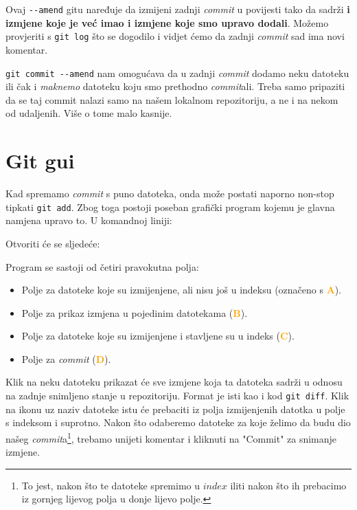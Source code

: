 
Ovaj \verb+--amend+ gitu naređuje da izmijeni zadnji \emph{commit} u povijesti tako da sadrži \textbf{i izmjene koje je već imao i izmjene koje smo upravo dodali}.
Možemo provjeriti s \verb+git log+ što se dogodilo i vidjet ćemo da zadnji \emph{commit} sad ima novi komentar.

\verb+git commit --amend+ nam omogućava da u zadnji \emph{commit} dodamo neku datoteku ili čak i \emph{maknemo} datoteku koju smo prethodno \emph{commit}ali. 
Treba samo pripaziti da se taj commit nalazi samo na našem lokalnom repozitoriju, a ne i na nekom od udaljenih. 
Više o tome malo kasnije.

\section*{Git gui}

Kad spremamo \emph{commit} s puno datoteka, onda može postati naporno non-stop tipkati \verb+git add+.
Zbog toga postoji poseban grafički program kojemu je glavna namjena upravo to.
U komandnoj liniji:


Otvoriti će se sljedeće:


Program se sastoji od četiri pravokutna polja:

\begin{itemize}
	\item Polje za datoteke koje su izmijenjene, ali nisu još u indeksu (označeno s \textcolor{orange}{\textbf{A}}).
	\item Polje za prikaz izmjena u pojedinim datotekama (\textcolor{orange}{\textbf{B}}). 
	\item Polje za datoteke koje su izmijenjene i stavljene su u indeks (\textcolor{orange}{\textbf{C}}).
	\item Polje za \emph{commit} (\textcolor{orange}{\textbf{D}}).
\end{itemize}

Klik na neku datoteku prikazat će sve izmjene koja ta datoteka sadrži u odnosu na zadnje snimljeno stanje u repozitoriju.
Format je isti kao i kod \verb+git diff+.
Klik na ikonu uz naziv datoteke istu će prebaciti iz polja izmijenjenih datotka u polje s indeksom i suprotno.
Nakon što odaberemo datoteke za koje želimo da budu dio našeg \emph{commit}a\footnote{To jest, nakon što te datoteke spremimo u $index$ iliti nakon što ih prebacimo iz gornjeg lijevog polja u donje lijevo polje.}, trebamo unijeti komentar i kliknuti na "Commit" za snimanje izmjene.

